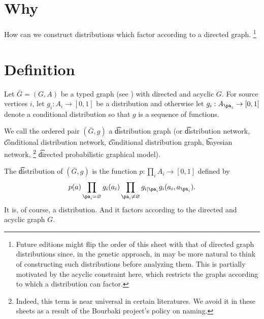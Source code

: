
\section*{Why}

How can we construct distributions which factor according to a directed graph.
    \ifhmode\unskip\fi\footnote{
Future editions might flip the order of this sheet with that of directed graph distributions since, in the genetic approach, in may be more natural to think of constructing such distributions before analyzing them. This is partially motivated by the acyclic constraint here, which restricts the graphs according to which a distribution can factor.
    }

\section*{Definition}

Let $\bar{G} = (G, A)$ be a typed graph (see ) with directed and acyclic $G$.
For source vertices $i$, let $g_i: A_i \to [0, 1]$ be a distribution and otherwise let $g_{i}: A_{\pa_i} \to [0, 1]$ denote a conditional distribution so that $g$ is a sequence of functions.

We call the ordered pair $(\bar{G}, g)$ a \t{distribution graph} (or \t{distribution network}, \t{conditional distribution network}, \t{conditional distribution graph}, \t{bayesian network},
    \ifhmode\unskip\fi\footnote{
Indeed, this term is near universal in certain literatures. We avoid it in these sheets as a result of the Bourbaki project's policy on naming.
    }
\t{directed probabilistic graphical model}).

The \t{distribution} of $(\bar{G}, g)$ is the function $p: \prod_{i} A_i \to [0, 1]$ defined by
    \[
p(a) \prod_{\pa_i = \varnothing} g_i(a_i) \prod_{\pa_i \neq \varnothing} g_{i \mid \pa_i} g_i(a_i, a_{\pa_i}).
    \]
It is, of course, a distribution.
And it factors according to the directed and acyclic graph $G$.

\blankpage